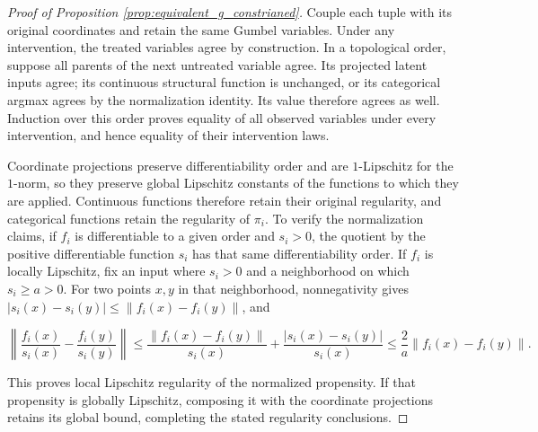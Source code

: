 \begin{proof}[Proof of Proposition \ref{prop:equivalent_g_constrianed}]
Couple each tuple with its original coordinates and retain the same Gumbel variables. Under any intervention, the treated variables agree by construction. In a topological order, suppose all parents of the next untreated variable agree. Its projected latent inputs agree; its continuous structural function is unchanged, or its categorical argmax agrees by the normalization identity. Its value therefore agrees as well. Induction over this order proves equality of all observed variables under every intervention, and hence equality of their intervention laws. 

Coordinate projections preserve differentiability order and are $1$-Lipschitz for the $1$-norm, so they preserve global Lipschitz constants of the functions to which they are applied. Continuous functions therefore retain their original regularity, and categorical functions retain the regularity of $\pi_i$. To verify the normalization claims, if $f_i$ is differentiable to a given order and $s_i>0$, the quotient by the positive differentiable function $s_i$ has that same differentiability order. If $f_i$ is locally Lipschitz, fix an input where $s_i>0$ and a neighborhood on which $s_i\geqslant a>0$. For two points $x,y$ in that neighborhood, nonnegativity gives $|s_i(x)-s_i(y)|\leqslant\|f_i(x)-f_i(y)\|$, and

\[
\left\|\frac{f_i(x)}{s_i(x)}-\frac{f_i(y)}{s_i(y)}\right\|
\leqslant\frac{\|f_i(x)-f_i(y)\|}{s_i(x)}+\frac{|s_i(x)-s_i(y)|}{s_i(x)}
\leqslant\frac{2}{a}\|f_i(x)-f_i(y)\|.
\]

This proves local Lipschitz regularity of the normalized propensity. If that propensity is globally Lipschitz, composing it with the coordinate projections retains its global bound, completing the stated regularity conclusions.
\end{proof}


